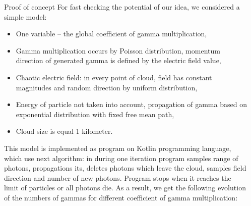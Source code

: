 \documentclass[final,hyperref={pdfpagelabels=false}]{beamer}
\begin{document}
\begin{frame}{}
\begin{columns}[t]
\begin{column}{0.32\linewidth}
                
            \end{column}%
            
            \begin{column}{0.32\linewidth}
                
                \begin{block}{Proof of concept}  \justifying
                    For fast checking the potential of our idea, we considered a simple model:  
                    \begin{itemize}
                        \item One variable -- the global coefficient of gamma multiplication,
                        \item Gamma multiplication occurs by Poisson distribution, momentum direction of generated gamma is defined by the electric field value,
                        \item Chaotic electric field: in every point of cloud, field has constant magnitudes and random direction by uniform distribution,
                        \item Energy of particle not taken into account, propagation of gamma based on exponential distribution with fixed free mean path,
                        \item Cloud size is equal 1 kilometer. 
                    \end{itemize}
                    This model is implemented as program on Kotlin programming language, which use next algorithm: in during one iteration program samples range of photons, propagations its, deletes photons which leave the cloud, samples field direction and number of new photons. Program stops when it reaches the limit of particles or all photons die.
                    As a result, we get the following evolution of the numbers of gammas for different coefficient of gamma multiplication:
                    \begin{figure}[htb]
                        \centering

\end{figure}
\end{block}
\end{column}
\end{columns}
\end{frame}
\end{document}
